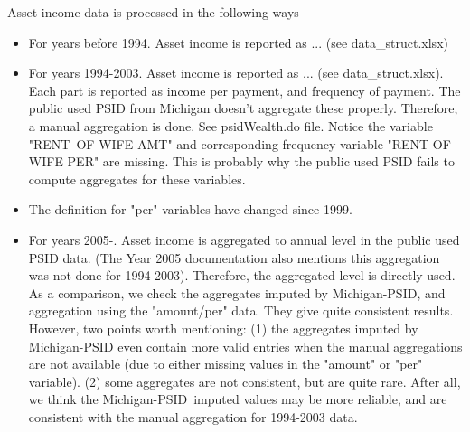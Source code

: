 \documentclass[12pt,notitlepage]{article}%
\begin{document}
Asset income data is processed in the following ways
\begin{itemize}
\item For years before 1994. Asset income is reported as ... (see data\_struct.xlsx)
\item For years 1994-2003. Asset income is reported as ... (see data\_struct.xlsx). Each part is reported as income per payment, and frequency of payment. The public used PSID from Michigan doesn't aggregate these properly. Therefore, a manual aggregation is done. See psidWealth.do file.
 Notice the variable "RENT\ OF WIFE AMT" and corresponding frequency variable "RENT OF WIFE PER" are missing. This is probably why the public used PSID fails to compute aggregates for these variables.

\item The definition for "per"
variables have changed since 1999.
\item For years 2005-. Asset income is aggregated to annual level in the public used PSID data. (The Year 2005 documentation also mentions this aggregation was not done for 1994-2003). Therefore, the aggregated level is directly used.
As a comparison, we check the aggregates imputed by Michigan-PSID,  and aggregation using the "amount/per" data. They give quite consistent results. However, two points worth mentioning: (1) the aggregates imputed by Michigan-PSID even contain more valid entries when the manual aggregations are not available (due to either missing values in the "amount" or "per" variable). (2) some aggregates are not consistent, but are quite rare. After all, we think the Michigan-PSID\ imputed values may be more reliable, and are consistent with the manual aggregation for 1994-2003 data.


\end{itemize}
\end{document}

